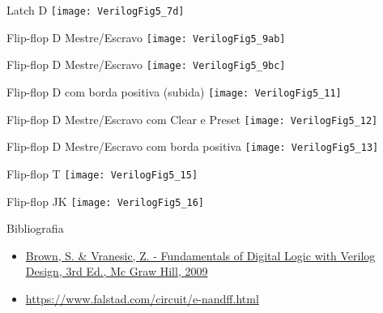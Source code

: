 \begin{frame}{Latch D}   \centering
    \texttt{[image: VerilogFig5\_7d]} \\
\end{frame}

\begin{frame}{Flip-flop D Mestre/Escravo}   \centering
    \texttt{[image: VerilogFig5\_9ab]} \\
\end{frame}

\begin{frame}{Flip-flop D Mestre/Escravo}   \centering
    \texttt{[image: VerilogFig5\_9bc]} \\
\end{frame}

\begin{frame}{Flip-flop D com borda positiva (subida)}   \centering
    \texttt{[image: VerilogFig5\_11]} \\
\end{frame}

\begin{frame}{Flip-flop D Mestre/Escravo com Clear e Preset}   \centering
    \texttt{[image: VerilogFig5\_12]} \\
\end{frame}

\begin{frame}{Flip-flop D Mestre/Escravo com borda positiva}   \centering
    \texttt{[image: VerilogFig5\_13]} \\
\end{frame}

\begin{frame}{Flip-flop T}   \centering
    \texttt{[image: VerilogFig5\_15]} \\
\end{frame}

\begin{frame}{Flip-flop JK}   \centering
    \texttt{[image: VerilogFig5\_16]} \\
\end{frame}

\begin{frame}{Bibliografia} 
	\begin{itemize}
		\item \href{https://www.google.com.br/search?q=filetype\%3Apdf+Fundamentals+of+Digital+Logic+with+Verilog+Design+&oq=filetype\%3Apdf}{Brown, S. \& Vranesic, Z. - Fundamentals of Digital Logic with Verilog Design, 3rd Ed., Mc Graw Hill, 2009}
		\item \href{https://www.falstad.com/circuit/e-nandff.html}{https://www.falstad.com/circuit/e-nandff.html}
	\end{itemize}
\end{frame}

\begin{frame}
	\titlepage
\end{frame} 


